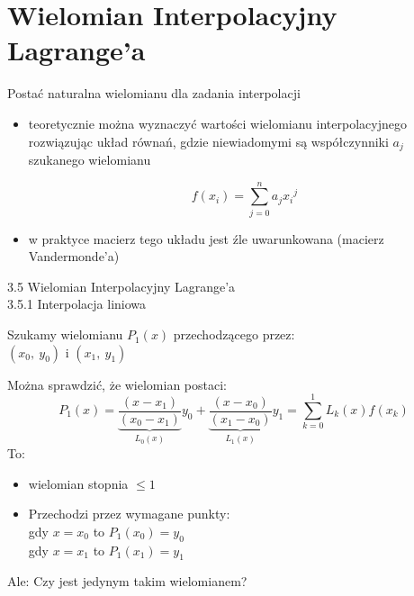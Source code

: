\section{Wielomian Interpolacyjny Lagrange'a}
\begin{frame}{Postać naturalna wielomianu dla zadania interpolacji}
\begin{itemize}
    \item teoretycznie można wyznaczyć wartości wielomianu interpolacyjnego rozwiązując układ równań, gdzie niewiadomymi są współczynniki  $a_{j}$
    szukanego wielomianu 
    
    $$f(x_i)=\sum_{j=0}^{n}a_{j}{x_i}^{j}$$
    \item w praktyce macierz tego układu jest źle uwarunkowana (macierz Vandermonde'a)
\end{itemize}
\end{frame}
\begin{frame}{3.5 Wielomian Interpolacyjny Lagrange'a \\ 3.5.1 Interpolacja liniowa}

Szukamy wielomianu $P_{1}(x)$ przechodzącego  przez:\\
$(x_{0},\ y_{0})$ i $(x_{1},\ y_{1})$

Można sprawdzić, że wielomian postaci:
$$
P_{1}(x)=\underbrace{\frac{(x-x_{1})}{(x_{0}-x_{1})}}_{L_0(x)}y_{0}+\underbrace{\frac{(x-x_{0})}{(x_{1}-x_{0})}}_{L_1(x)}y_{1}=\sum_{k=0}^{1}L_{k}(x)f(x_{k})
$$
To:
\begin{itemize}
\item wielomian stopnia $\leq 1$

\item Przechodzi przez wymagane punkty:\\
gdy $x=x_{0}$ to $ P_1(x_{0})=y_{0}$ \\
gdy $x=x_{1}$ to $P_1(x_{1})=y_{1}$ \\
\end{itemize}
\begin{flushright}Ale: Czy jest jedynym takim wielomianem?\end{flushright}

\end{frame}


